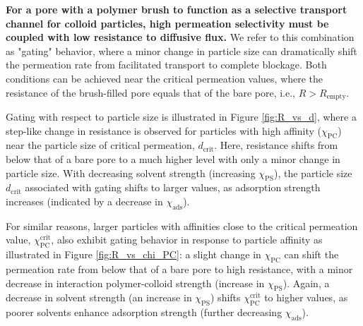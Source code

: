 \documentclass[12pt, a4paper]{article}
\begin{document}
\textbf{For a pore with a polymer brush to function as a selective transport channel for colloid particles, high permeation selectivity must be coupled with low resistance to diffusive flux.}
We refer to this combination as "gating" behavior, where a minor change in particle size can dramatically shift the permeation rate from facilitated transport to complete blockage.
Both conditions can be achieved near the critical permeation values, where the resistance of the brush-filled pore equals that of the bare pore, i.e., $R > R_{\text{empty}}$.

Gating with respect to particle size is illustrated in Figure \ref{fig:R_vs_d}, where a step-like change in resistance is observed for particles with high affinity ($\chi_{\text{PC}}$) near the particle size of critical permeation, $d_{\text{crit}}$.
Here, resistance shifts from below that of a bare pore to a much higher level with only a minor change in particle size.
With decreasing solvent strength (increasing $\chi_{\text{PS}}$), the particle size $d_{\text{crit}}$ associated with gating shifts to larger values, as adsorption strength increases (indicated by a decrease in $\chi_{\text{ads}}$).

For similar reasons, larger particles with affinities close to the critical permeation value, $\chi^{\text{crit}}_{\text{PC}}$, also exhibit gating behavior in response to particle affinity as illustrated in Figure \ref{fig:R_vs_chi_PC}: a slight change in $\chi_{\text{PC}}$ can shift the permeation rate from below that of a bare pore to high resistance, with a minor decrease in interaction polymer-colloid strength (increase in $\chi_{\text{PS}}$).
Again, a decrease in solvent strength (an increase in $\chi_{\text{PS}}$) shifts $\chi^{\text{crit}}_{\text{PC}}$ to higher values, as poorer solvents enhance adsorption strength (further decreasing $\chi_{\text{ads}}$).
\end{document}

